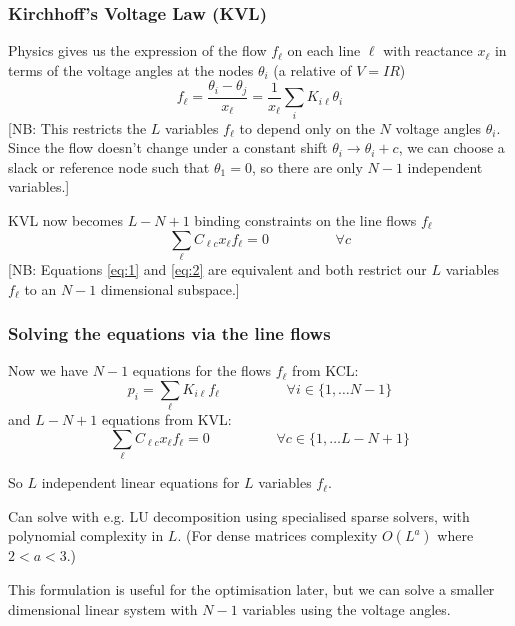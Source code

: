 \documentclass[10pt,aspectratio=169,dvipsnames]{beamer}
\begin{document}
\begin{frame}
  \frametitle{Kirchhoff's Voltage Law (KVL)}

  Physics gives us the expression of the flow $f_\ell$ on each line $\ell$ with reactance $x_\ell$ in terms of the voltage angles at the nodes $\theta_i$  (a
  relative of $V = IR$)
  \begin{equation}
    f_\ell = \frac{\theta_i - \theta_j}{x_\ell} = \frac{1}{x_\ell}\sum_{i} K_{i\ell} \theta_i \label{eq:1}
  \end{equation}
      [NB: This restricts the $L$ variables $f_\ell$ to depend only on the $N$ voltage angles $\theta_i$. Since the flow doesn't change under a constant shift $\theta_i \to \theta_i + c$, we can choose   a \alert{slack} or \alert{reference node} such that  $\theta_1 = 0$, so there are only $N-1$ independent variables.]

      \vspace{.5cm}


  KVL now becomes $L-N+1$ binding constraints on the line flows $f_\ell$
  \begin{equation}
    \sum_\ell C_{\ell c} x_\ell f_\ell = 0 \hspace{2cm} \forall c  \label{eq:2}
  \end{equation}
  [NB: Equations \eqref{eq:1} and  \eqref{eq:2} are equivalent and both restrict our $L$ variables $f_\ell$ to an $N-1$ dimensional subspace.]

\end{frame}

\begin{frame}
  \frametitle{Solving the equations via the line flows}

  Now we have $N-1$ equations for the flows $f_\ell$ from KCL:
  \begin{equation*}
    p_i = \sum_\ell K_{i\ell} f_\ell \hspace{2cm}\forall i \in \{ 1, \dots N-1 \}
  \end{equation*}
  and $L-N+1$ equations from KVL:
  \begin{equation*}
    \sum_\ell C_{\ell c} x_\ell f_\ell = 0 \hspace{2cm}\forall c \in \{ 1, \dots L-N+1 \}
  \end{equation*}

  So $L$ independent linear equations for $L$ variables $f_\ell$.

  Can solve with e.g. LU decomposition using specialised sparse solvers, with polynomial complexity in $L$. (For dense matrices complexity $O(L^a)$ where $2 < a < 3$.)

  This formulation is useful for the optimisation later, but we can solve a smaller dimensional linear system with $N-1$ variables using the voltage angles.
\end{frame}
\end{document}
